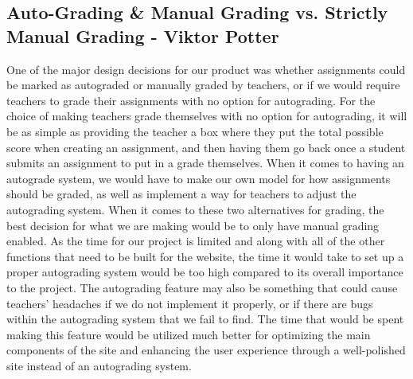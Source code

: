 \documentclass[12pt, letterpaper]{article}
\begin{document}
\subsection*{Auto-Grading \& Manual Grading vs. Strictly Manual Grading - Viktor Potter}
One of the major design decisions for our product was whether assignments could be marked as autograded or manually graded by teachers, or if we would require teachers to grade their assignments with no option for autograding. For the choice of making teachers grade themselves with no option for autograding, it will be as simple as providing the teacher a box where they put the total possible score when creating an assignment, and then having them go back once a student submits an assignment to put in a grade themselves. When it comes to having an autograde system, we would have to make our own model for how assignments should be graded, as well as implement a way for teachers to adjust the autograding system. When it comes to these two alternatives for grading, the best decision for what we are making would be to only have manual grading enabled. As the time for our project is limited and along with all of the other functions that need to be built for the website, the time it would take to set up a proper autograding system would be too high compared to its overall importance to the project. The autograding feature may also be something that could cause teachers' headaches if we do not implement it properly, or if there are bugs within the autograding system that we fail to find. The time that would be spent making this feature would be utilized much better for optimizing the main components of the site and enhancing the user experience through a well-polished site instead of an autograding system.
\end{document}
